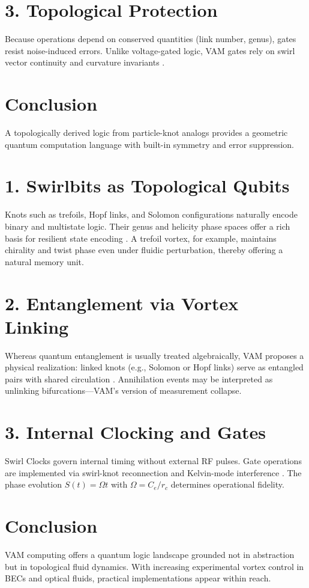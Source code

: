 \documentclass[a4paper,11pt]{article}
\begin{document}
\section*{3. Topological Protection}
Because operations depend on conserved quantities (link number, genus), gates resist noise-induced errors. Unlike voltage-gated logic, VAM gates rely on swirl vector continuity and curvature invariants \cite{Kauffman1991}.

\section*{Conclusion}
A topologically derived logic from particle-knot analogs provides a geometric quantum computation language with built-in symmetry and error suppression.


\section*{1. Swirlbits as Topological Qubits}
Knots such as trefoils, Hopf links, and Solomon configurations naturally encode binary and multistate logic. Their genus and helicity phase spaces offer a rich basis for resilient state encoding \cite{Kauffman1991,Vilenkin1994}. A trefoil vortex, for example, maintains chirality and twist phase even under fluidic perturbation, thereby offering a natural memory unit.

\section*{2. Entanglement via Vortex Linking}
Whereas quantum entanglement is usually treated algebraically, VAM proposes a physical realization: linked knots (e.g., Solomon or Hopf links) serve as entangled pairs with shared circulation \cite{Iskandarani2025,Hall2016}. Annihilation events may be interpreted as unlinking bifurcations---VAM's version of measurement collapse.

\section*{3. Internal Clocking and Gates}
Swirl Clocks govern internal timing without external RF pulses. Gate operations are implemented via swirl-knot reconnection and Kelvin-mode interference \cite{Anderson2001,Berloff2014}. The phase evolution \( S(t) = \Omega t \) with \( \Omega = C_e / r_c \) determines operational fidelity.

\section*{Conclusion}
VAM computing offers a quantum logic landscape grounded not in abstraction but in topological fluid dynamics. With increasing experimental vortex control in BECs and optical fluids, practical implementations appear within reach.



\end{document}
